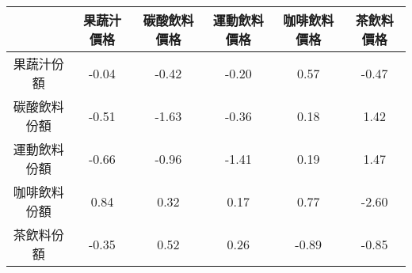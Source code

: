 \begin{tabular}{cccccc}
  \hline
 & 果蔬汁價格 & 碳酸飲料價格 & 運動飲料價格 & 咖啡飲料價格 & 茶飲料價格 \\ 
  \hline
果蔬汁份額 & -0.04 & -0.42 & -0.20 & 0.57 & -0.47 \\ 
  碳酸飲料份額 & -0.51 & -1.63 & -0.36 & 0.18 & 1.42 \\ 
  運動飲料份額 & -0.66 & -0.96 & -1.41 & 0.19 & 1.47 \\ 
  咖啡飲料份額 & 0.84 & 0.32 & 0.17 & 0.77 & -2.60 \\ 
  茶飲料份額 & -0.35 & 0.52 & 0.26 & -0.89 & -0.85 \\ 
   \hline
\end{tabular}
